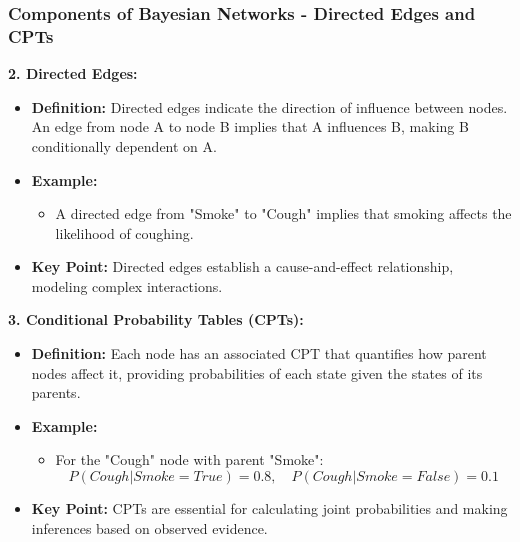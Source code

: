 \documentclass[aspectratio=169]{beamer}
\begin{document}
\begin{frame}[fragile]
    \frametitle{Components of Bayesian Networks - Directed Edges and CPTs}
    \textbf{2. Directed Edges:}
    \begin{itemize}
        \item \textbf{Definition:} Directed edges indicate the direction of influence between nodes. An edge from node A to node B implies that A influences B, making B conditionally dependent on A.
        
        \item \textbf{Example:}
        \begin{itemize}
            \item A directed edge from "Smoke" to "Cough" implies that smoking affects the likelihood of coughing.
        \end{itemize}
        
        \item \textbf{Key Point:} Directed edges establish a cause-and-effect relationship, modeling complex interactions.
    \end{itemize}

    \bigskip

    \textbf{3. Conditional Probability Tables (CPTs):}
    \begin{itemize}
        \item \textbf{Definition:} Each node has an associated CPT that quantifies how parent nodes affect it, providing probabilities of each state given the states of its parents.
        
        \item \textbf{Example:}
        \begin{itemize}
            \item For the "Cough" node with parent "Smoke": 
            \[
            P(Cough | Smoke=True) = 0.8, \quad P(Cough | Smoke=False) = 0.1 
            \]
        \end{itemize}
        
        \item \textbf{Key Point:} CPTs are essential for calculating joint probabilities and making inferences based on observed evidence.
    \end{itemize}
\end{frame}
\end{document}
